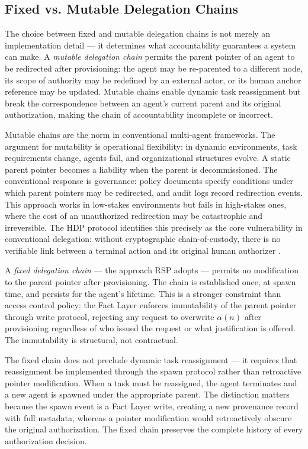 \subsection{Fixed vs. Mutable Delegation Chains}

The choice between fixed and mutable delegation chains is not merely an implementation detail --- it determines what accountability guarantees a system can make. A \emph{mutable delegation chain} permits the parent pointer of an agent to be redirected after provisioning: the agent may be re-parented to a different node, its scope of authority may be redefined by an external actor, or its human anchor reference may be updated. Mutable chains enable dynamic task reassignment but break the correspondence between an agent's current parent and its original authorization, making the chain of accountability incomplete or incorrect.

Mutable chains are the norm in conventional multi-agent frameworks. The argument for mutability is operational flexibility: in dynamic environments, task requirements change, agents fail, and organizational structures evolve. A static parent pointer becomes a liability when the parent is decommissioned. The conventional response is governance: policy documents specify conditions under which parent pointers may be redirected, and audit logs record redirection events. This approach works in low-stakes environments but fails in high-stakes ones, where the cost of an unauthorized redirection may be catastrophic and irreversible. The HDP protocol identifies this precisely as the core vulnerability in conventional delegation: without cryptographic chain-of-custody, there is no verifiable link between a terminal action and its original human authorizer \cite{helixar2025hdp, helixar2025hdp2}.

A \emph{fixed delegation chain} --- the approach RSP adopts --- permits no modification to the parent pointer after provisioning. The chain is established once, at spawn time, and persists for the agent's lifetime. This is a stronger constraint than access control policy: the Fact Layer enforces immutability of the parent pointer through write protocol, rejecting any request to overwrite $\alpha(n)$ after provisioning regardless of who issued the request or what justification is offered. The immutability is structural, not contractual.

The fixed chain does not preclude dynamic task reassignment --- it requires that reassignment be implemented through the spawn protocol rather than retroactive pointer modification. When a task must be reassigned, the agent terminates and a new agent is spawned under the appropriate parent. The distinction matters because the spawn event is a Fact Layer write, creating a new provenance record with full metadata, whereas a pointer modification would retroactively obscure the original authorization. The fixed chain preserves the complete history of every authorization decision.

